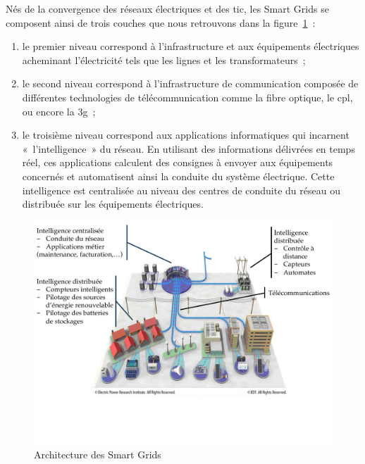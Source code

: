 Nés de la convergence des réseaux électriques et des \gls{tic}, les Smart Grids 
se composent ainsi de trois couches que nous retrouvons dans la figure~\ref{fig:archismartGrids}~:

\begin{enumerate}
    \item le premier niveau correspond à l'infrastructure et aux équipements 
    électriques acheminant l'électricité tels que les lignes et les 
    transformateurs~; 
    \item le second niveau correspond à l'infrastructure de communication 
    composée de différentes technologies de télécommunication comme la fibre 
    optique, le \gls{cpl}, ou encore la \gls{3g}~; 
    \item le troisième niveau correspond aux applications informatiques qui 
    incarnent «~l'intelligence~» du réseau. En utilisant des informations 
    délivrées en temps réel, ces applications calculent des consignes à envoyer 
    aux équipements concernés et automatisent ainsi la conduite du système 
    électrique.  Cette intelligence est centralisée au niveau des centres de 
    conduite du réseau ou distribuée sur les équipements électriques. 
\end{enumerate}

\begin{figure}[!htbp]
  
\includegraphics[trim= 0cm 4cm 0cm 0cm, width=1\textwidth]{figures/1_problematique/archiSmartGrids.pdf}
 \caption{Architecture des Smart Grids \protect\cite{favre2006ingenierie}}
 \label{fig:archismartGrids}
\end{figure}



